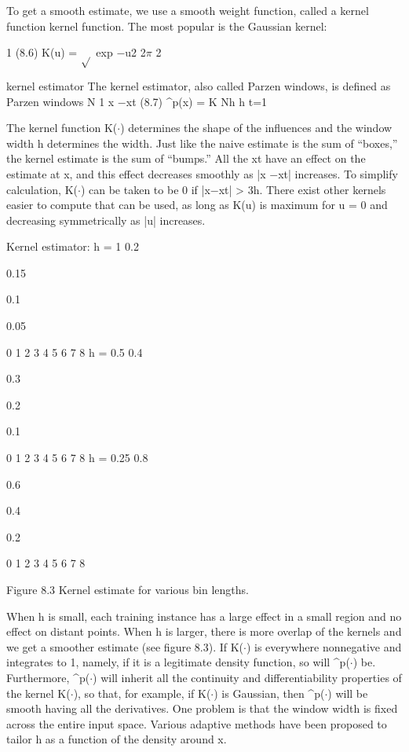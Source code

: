 To get a smooth estimate, we use a smooth weight function, called a kernel function kernel function. The most popular is the Gaussian kernel:

1 (8.6) K(u) = $\sqrt{}$ exp $-$u2 2$\pi$ 2

kernel estimator The kernel estimator, also called Parzen windows, is defined as Parzen windows N 1 x $-$xt (8.7) \textasciicircum{}p(x) = K Nh h t=1

The kernel function K($\cdot$) determines the shape of the influences and the window width h determines the width. Just like the naive estimate is the sum of “boxes,” the kernel estimate is the sum of “bumps.” All the xt have an effect on the estimate at x, and this effect decreases smoothly as |x $-$xt| increases. To simplify calculation, K($\cdot$) can be taken to be 0 if |x$-$xt| > 3h. There exist other kernels easier to compute that can be used, as long as K(u) is maximum for u = 0 and decreasing symmetrically as |u| increases.

Kernel estimator: h = 1 0.2

0.15

0.1

0.05

0 1 2 3 4 5 6 7 8 h = 0.5 0.4

0.3

0.2

0.1

0 1 2 3 4 5 6 7 8 h = 0.25 0.8

0.6

0.4

0.2

0 1 2 3 4 5 6 7 8

Figure 8.3 Kernel estimate for various bin lengths.

When h is small, each training instance has a large effect in a small region and no effect on distant points. When h is larger, there is more overlap of the kernels and we get a smoother estimate (see figure 8.3). If K($\cdot$) is everywhere nonnegative and integrates to 1, namely, if it is a legitimate density function, so will \textasciicircum{}p($\cdot$) be. Furthermore, \textasciicircum{}p($\cdot$) will inherit all the continuity and differentiability properties of the kernel K($\cdot$), so that, for example, if K($\cdot$) is Gaussian, then \textasciicircum{}p($\cdot$) will be smooth having all the derivatives. One problem is that the window width is fixed across the entire input space. Various adaptive methods have been proposed to tailor h as a function of the density around x.

